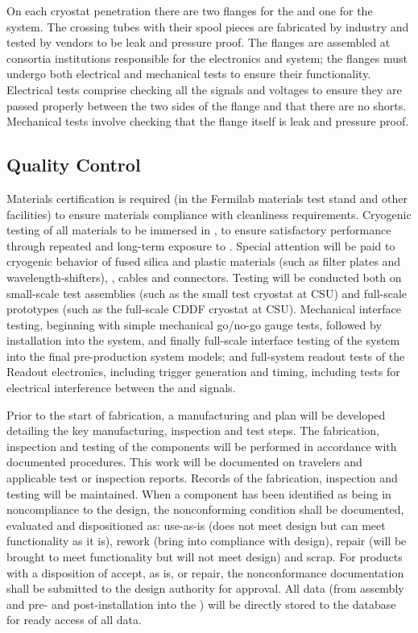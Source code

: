 On each cryostat penetration there are two flanges for the 
and one for the  system. The crossing tubes with their spool
pieces are fabricated by industry and tested by vendors to be leak and
pressure proof. The flanges are assembled at consortia institutions
responsible for the  electronics and  system; the
flanges must undergo both electrical and mechanical tests to ensure
their functionality. Electrical tests comprise checking all the
signals and voltages to ensure they are passed properly between the
two sides of the flange and that there are no shorts. Mechanical tests
involve checking that the flange itself is leak and pressure proof.

\subsection{ Quality Control}

Materials certification is required (in the Fermilab materials test
stand and other facilities) to ensure materials compliance with
cleanliness requirements. Cryogenic testing of all materials to be
immersed in , to ensure satisfactory performance through repeated
and long-term exposure to . Special attention will be paid to
cryogenic behavior of fused silica and plastic materials (such as
filter plates and wavelength-shifters), , cables and
connectors. Testing will be conducted both on small-scale test
assemblies (such as the small test cryostat at CSU) and full-scale
prototypes (such as the full-scale CDDF cryostat at CSU). Mechanical
interface testing, beginning with simple mechanical go/no-go gauge
tests, followed by installation into the  system, and
finally full-scale interface testing of the  system into the final
pre-production  system models; and full-system readout tests of the
 Readout electronics, including trigger generation and timing,
including tests for electrical interference between the  and 
signals.

Prior to the start of fabrication, a manufacturing and  plan will be
developed detailing the key manufacturing, inspection and test
steps. The fabrication, inspection and testing of the components will
be performed in accordance with documented procedures. This work will
be documented on travelers and applicable test or inspection
reports. Records of the fabrication, inspection and testing will be
maintained. When a component has been identified as being in
noncompliance to the design, the nonconforming condition shall be
documented, evaluated and dispositioned as: use-as-is (does not meet
design but can meet functionality as it is), rework (bring into
compliance with design), repair (will be brought to meet functionality
but will not meet design) and scrap. For products with a disposition
of accept, as is, or repair, the nonconformance documentation shall be
submitted to the design authority for approval. All  data (from
assembly and pre- and post-installation into the ) will be directly
stored to the  database for ready access of all  data.

